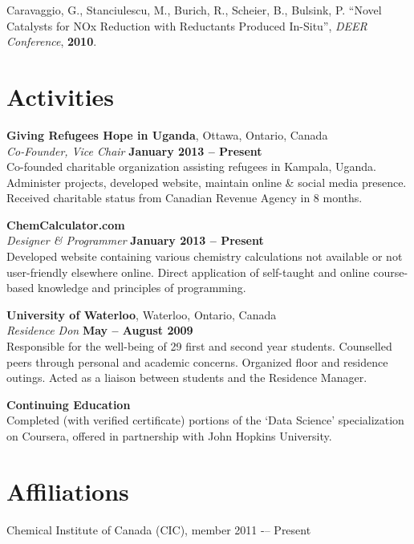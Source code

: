 \documentclass[margin,line]{resume}
\begin{document}
\begin{resume}
	\vspace{0mm}
Caravaggio, G., Stanciulescu, M., Burich, R., Scheier, B., Bulsink, P. ``Novel Catalysts for NOx Reduction with Reductants Produced In-Situ'', \textit{DEER Conference}, \textbf{2010}.
\vspace{1mm}

    \section{\mysidestyle Activities}

    \textbf{Giving Refugees Hope in Uganda}, Ottawa, Ontario, Canada\\\vspace{1mm}%
    \textsl{Co-Founder, Vice Chair} \hfill \textbf{January 2013 -- Present}\\
    Co-founded charitable organization assisting refugees in Kampala, Uganda. Administer projects, developed website, maintain online \& social media presence. Received charitable status from Canadian Revenue Agency in 8 months.

    \textbf{ChemCalculator.com}\\\vspace{1mm}%
    \textsl{Designer \& Programmer} \hfill \textbf{January 2013 -- Present}\\
    Developed website containing various chemistry calculations not available or not user-friendly elsewhere online. Direct application of self-taught and online course-based knowledge and principles of programming. 

    \textbf{University of Waterloo}, Waterloo, Ontario, Canada\\\vspace{1mm}%
    \textsl{Residence Don} \hfill \textbf{May -- August 2009}\\
    Responsible for the well-being of 29 first and second year students. Counselled peers through personal and academic concerns. Organized floor and residence outings. Acted as a liaison between students and the Residence Manager.

	\textbf{Continuing Education}\\
	Completed (with verified certificate) portions of the `Data Science' specialization on Coursera, offered in partnership with John Hopkins University.
	
\vspace{1mm}
    \section{\mysidestyle Affiliations} 

    Chemical Institute of Canada (CIC), member 2011 -– Present


\end{resume}
\end{document}

